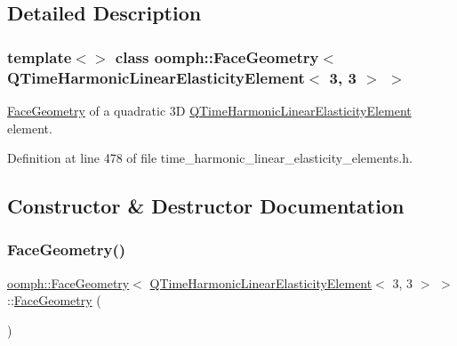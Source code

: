 \subsection{Detailed Description}
\subsubsection*{template$<$$>$\newline
class oomph\+::\+Face\+Geometry$<$ Q\+Time\+Harmonic\+Linear\+Elasticity\+Element$<$ 3, 3 $>$ $>$}

\hyperlink{classoomph_1_1FaceGeometry}{Face\+Geometry} of a quadratic 3D \hyperlink{classoomph_1_1QTimeHarmonicLinearElasticityElement}{Q\+Time\+Harmonic\+Linear\+Elasticity\+Element} element. 

Definition at line 478 of file time\+\_\+harmonic\+\_\+linear\+\_\+elasticity\+\_\+elements.\+h.



\subsection{Constructor \& Destructor Documentation}
\mbox{\label{classoomph_1_1FaceGeometry_3_01QTimeHarmonicLinearElasticityElement_3_013_00_013_01_4_01_4_a97003e3021aac73a54e01dd44303bdfb}} 
\subsubsection{\texorpdfstring{Face\+Geometry()}{FaceGeometry()}}
{\footnotesize\ttfamily \hyperlink{classoomph_1_1FaceGeometry}{oomph\+::\+Face\+Geometry}$<$ \hyperlink{classoomph_1_1QTimeHarmonicLinearElasticityElement}{Q\+Time\+Harmonic\+Linear\+Elasticity\+Element}$<$ 3, 3 $>$ $>$\+::\hyperlink{classoomph_1_1FaceGeometry}{Face\+Geometry} (\begin{DoxyParamCaption}{ }\end{DoxyParamCaption})\hspace{0.3cm}{\ttfamily [inline]}}




